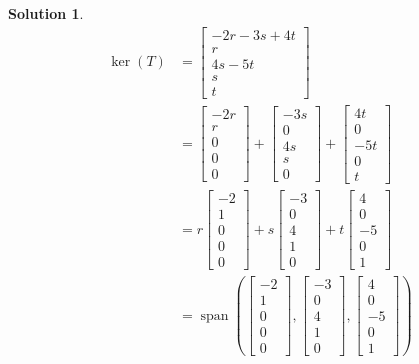 \documentclass{article}
\newtheorem*{solution}{Solution}
\DeclareMathOperator{\Span}{span}
\begin{document}
\begin{solution}
\begin{align*}
\ker(T) &= \begin{bmatrix}
-2r - 3s + 4t \\
r \\
4s - 5t \\
s \\
t
\end{bmatrix} \\
&=
\begin{bmatrix} -2r \\ r \\ 0 \\ 0 \\ 0 \end{bmatrix} +
\begin{bmatrix} -3s \\ 0 \\ 4s \\ s \\ 0 \end{bmatrix} +
\begin{bmatrix} 4t \\ 0 \\ -5t \\ 0 \\ t \end{bmatrix} \\
&=
r \begin{bmatrix} -2 \\ 1 \\ 0 \\ 0 \\ 0 \end{bmatrix} +
s \begin{bmatrix} -3 \\ 0 \\ 4 \\ 1 \\ 0 \end{bmatrix} +
t \begin{bmatrix} 4 \\ 0 \\ -5 \\ 0 \\ 1 \end{bmatrix} \\
&=
\Span \left( \begin{bmatrix} -2 \\ 1 \\ 0 \\ 0 \\ 0 \end{bmatrix},
\begin{bmatrix} -3 \\ 0 \\ 4 \\ 1 \\ 0 \end{bmatrix},
\begin{bmatrix} 4 \\ 0 \\ -5 \\ 0 \\ 1 \end{bmatrix} \right)
\end{align*}

\end{solution}
\end{document}
